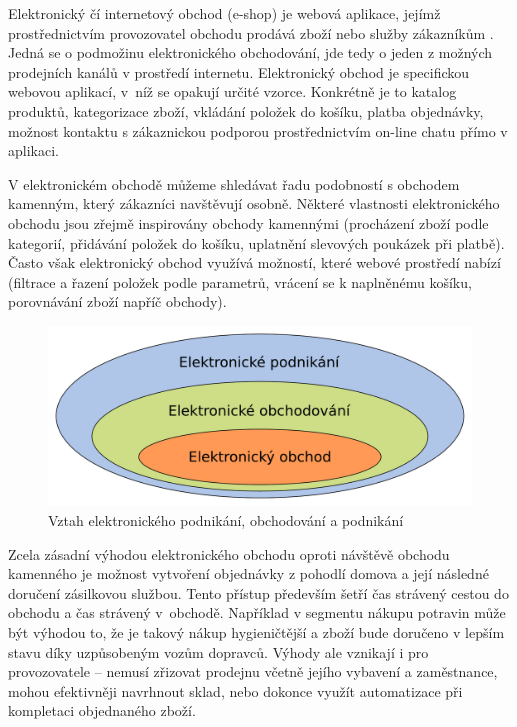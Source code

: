 \documentclass[FM,DP]{tulthesis}
\begin{document}
Elektronický čí internetový obchod (e-shop) je webová aplikace, jejímž prostřednictvím 
provozovatel obchodu prodává zboží nebo služby zákazníkům \cite[strana~16]{e-commerce}.
Jedná se o podmožinu elektronického obchodování, jde tedy o jeden z možných prodejních 
kanálů v prostředí internetu. Elektronický obchod je specifickou webovou aplikací, v~níž 
se opakují určité vzorce. Konkrétně je to katalog produktů, kategorizace zboží, 
vkládání položek do košíku, platba objednávky, možnost kontaktu s zákaznickou podporou 
prostřednictvím on-line chatu přímo v aplikaci.

V elektronickém obchodě můžeme shledávat řadu podobností s obchodem kamenným, který zákazníci 
navštěvují osobně. Některé vlastnosti elektronického obchodu jsou zřejmě inspirovány 
obchody kamennými (procházení zboží podle kategorií, přidávání položek do košíku, 
uplatnění slevových poukázek při platbě). Často však elektronický obchod využívá možností, 
které webové prostředí nabízí (filtrace a řazení položek podle parametrů, vrácení se
k naplněnému košíku, porovnávání zboží napříč obchody).

\begin{figure}[h]
\center
\includegraphics[width=\textwidth]{e-commerce.pdf}
\caption{Vztah elektronického podnikání, obchodování a podnikání}
\label{e-commerce}
\end{figure}

Zcela zásadní výhodou elektronického obchodu oproti návštěvě obchodu kamenného
je možnost vytvoření objednávky z pohodlí domova a její následné doručení zásilkovou 
službou. Tento přístup především šetří čas strávený cestou do obchodu a čas strávený 
v~obchodě. Například v segmentu nákupu potravin může být výhodou to, že je takový 
nákup hygieničtější a zboží bude doručeno v lepším stavu díky uzpůsobeným vozům dopravců.
Výhody ale vznikají i pro provozovatele -- nemusí zřizovat prodejnu včetně jejího vybavení a 
zaměstnance, mohou efektivněji navrhnout sklad, nebo dokonce využít automatizace 
při kompletaci objednaného zboží.
\end{document}
